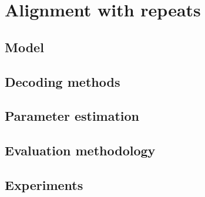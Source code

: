 \chapter{Alignment with repeats}

\section{Model}
\section{Decoding methods}
\section{Parameter estimation}
\section{Evaluation methodology}
\section{Experiments}
